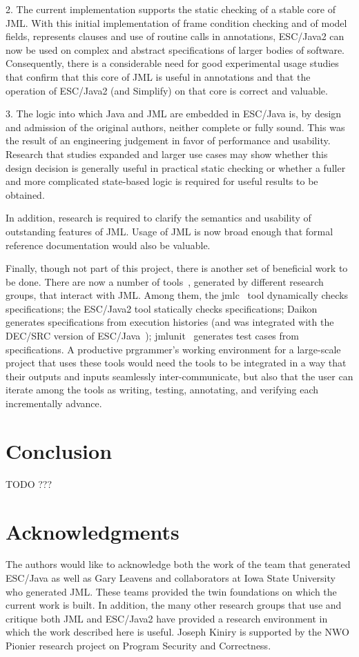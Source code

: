 \documentclass{acm_proc_article-sp}
\begin{document}
2. The current implementation supports the static checking of a
  stable core of JML.  With this initial implementation of frame
  condition checking and of model fields, represents clauses and use
  of routine calls in annotations, ESC/Java2 can now be used on
  complex and abstract specifications of larger bodies of software.
  Consequently, there is a considerable need for good experimental
  usage studies that confirm that this core of JML is useful in
  annotations and that the operation of ESC/Java2 (and Simplify) on
  that core is correct and valuable.

3. The logic into which Java and JML are embedded in ESC/Java is,
  by design and admission of the original authors, neither complete or
  fully sound.  This was the result of an engineering judgement in
  favor of performance and usability.  Research that studies expanded
  and larger use cases may show whether this design decision is
  generally useful in practical static checking or whether a fuller
  and more complicated state-based logic is required for useful
  results to be obtained.

In addition, research is required to clarify the semantics and usability of
  outstanding features of JML.  Usage of JML is now broad enough that
  formal reference documentation would also be valuable.

Finally, though not part of this project, there is another set of beneficial
work to be done.  There are now a number of tools~\cite{Burdy-etal03},
generated by different research groups, that interact with JML.  Among
them, the jmlc~\cite{Cheon-Leavens02b} tool dynamically checks
specifications; the ESC/Java2 tool statically checks specifications;
Daikon generates specifications from execution histories (and was
integrated with the DEC/SRC version of ESC/Java~\cite{NimmerErnst01});
jmlunit~\cite{Cheon-Leavens02} generates test cases from
specifications.  A productive prgrammer's working environment for a
large-scale project that uses these tools would need the tools to be integrated
in a way that their outputs and inputs seamlessly inter-communicate, but
also that the user can iterate among the tools as writing, testing, 
annotating, and verifying each incrementally advance.

\section{Conclusion}
TODO ???

\section{Acknowledgments}
The authors would like to acknowledge both the work of the team that
generated ESC/Java as well as Gary Leavens and collaborators at Iowa
State University who generated JML.  These teams provided the twin
foundations on which the current work is built.  In addition, the many
other research groups that use and critique both JML and ESC/Java2
have provided a research environment in which the work described here
is useful.  Joseph Kiniry is supported by the NWO Pionier research
project on Program Security and Correctness.
\end{document}
